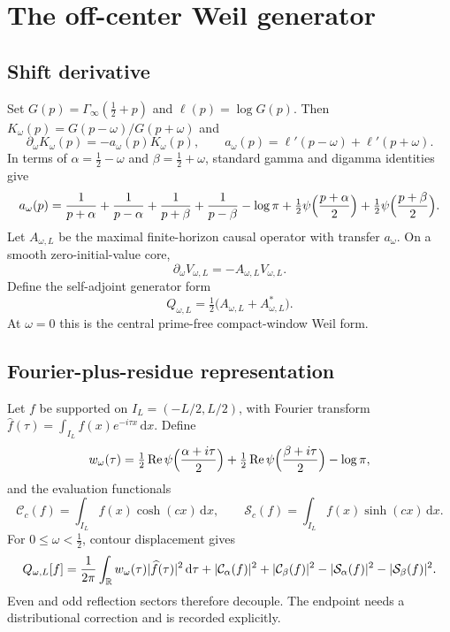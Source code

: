 \documentclass[11pt,a4paper]{article}
\newcommand{\R}{\mathbb R}
\newcommand{\Ginf}{\Gamma_{\!\infty}}
\renewcommand{\Re}{\operatorname{Re}}
\newcommand{\dd}{\,\mathrm d}
\newcommand{\Cc}{\mathcal C}
\newcommand{\Ss}{\mathcal S}
\DeclarePairedDelimiter{\abs}{\lvert}{\rvert}
\theoremstyle{plain}
\theoremstyle{definition}
\numberwithin{equation}{section}
\begin{document}
\section{The off-center Weil generator}

\subsection{Shift derivative}

Set $G(p)=\Ginf(\tfrac12+p)$ and $\ell(p)=\log G(p)$. Then
$K_\omega(p)=G(p-\omega)/G(p+\omega)$ and
\begin{equation}\label{eq:dK}
\partial_\omega K_\omega(p)=-a_\omega(p)K_\omega(p),
\qquad
a_\omega(p)=\ell'(p-\omega)+\ell'(p+\omega).
\end{equation}
In terms of $\alpha=\tfrac12-\omega$ and $\beta=\tfrac12+\omega$, standard
gamma and digamma identities~\cite{DLMF} give
\begin{equation}\label{eq:a-mult}
a_\omega(p)=
\frac1{p+\alpha}+\frac1{p-\alpha}+\frac1{p+\beta}+\frac1{p-\beta}
-\log\pi
+\tfrac12\psi\Bigl(\frac{p+\alpha}2\Bigr)+\tfrac12\psi\Bigl(\frac{p+\beta}2\Bigr).
\end{equation}
Let $A_{\omega,L}$ be the maximal finite-horizon causal operator with transfer
$a_\omega$. On a smooth zero-initial-value core,
\begin{equation}
\partial_\omega V_{\omega,L}=-A_{\omega,L}V_{\omega,L}.
\end{equation}
Define the self-adjoint generator form
\begin{equation}\label{eq:Qdef}
Q_{\omega,L}=\tfrac12\bigl(A_{\omega,L}+A_{\omega,L}^{*}\bigr).
\end{equation}
At $\omega=0$ this is the central prime-free compact-window Weil form.

\subsection{Fourier-plus-residue representation}

Let $f$ be supported on $I_L=(-L/2,L/2)$, with Fourier transform
$\widehat f(\tau)=\int_{I_L}f(x)e^{-i\tau x}\dd x$. Define
\begin{equation}\label{eq:w}
w_\omega(\tau)=\tfrac12\Re\psi\Bigl(\frac{\alpha+i\tau}2\Bigr)
+\tfrac12\Re\psi\Bigl(\frac{\beta+i\tau}2\Bigr)-\log\pi,
\end{equation}
and the evaluation functionals
\begin{equation}
\Cc_c(f)=\int_{I_L}f(x)\cosh(cx)\dd x,\qquad
\Ss_c(f)=\int_{I_L}f(x)\sinh(cx)\dd x .
\end{equation}
For $0\le\omega<\tfrac12$, contour displacement gives
\begin{equation}\label{eq:Q-fourier}
Q_{\omega,L}[f]=\frac1{2\pi}\int_\R w_\omega(\tau)\abs{\widehat f(\tau)}^2\dd\tau
+\abs{\Cc_\alpha(f)}^2+\abs{\Cc_\beta(f)}^2
-\abs{\Ss_\alpha(f)}^2-\abs{\Ss_\beta(f)}^2 .
\end{equation}
Even and odd reflection sectors therefore decouple. The endpoint needs a
distributional correction and is recorded explicitly.
\end{document}
